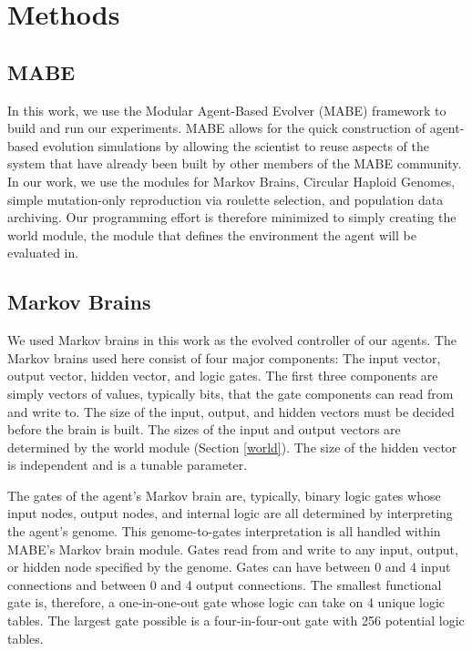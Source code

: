 \section{Methods}

\subsection{MABE}\label{mabe}

In this work, we use the Modular Agent-Based Evolver\cite{bohm_mabe_2017} (MABE) framework to build and run our experiments. MABE allows for the quick construction of agent-based evolution simulations by allowing the scientist to reuse aspects of the system that have already been built by other members of the MABE community. In our work, we use the modules for Markov Brains, Circular Haploid Genomes, simple mutation-only reproduction via roulette selection, and population data archiving. Our programming effort is therefore minimized to simply creating the world module, the module that defines the environment the agent will be evaluated in.

\subsection*{Markov Brains}

We used Markov brains in this work as the evolved controller of our agents. The Markov brains used here consist of four major components: The input vector, output vector, hidden vector, and logic gates. The first three components are simply vectors of values, typically bits, that the gate components can read from and write to. The size of the input, output, and hidden vectors must be decided before the brain is built. The sizes of the input and output vectors are determined by the world module (Section \ref{world}). The size of the hidden vector is independent and is a tunable parameter. 

The gates of the agent's Markov brain are, typically, binary logic gates whose input nodes, output nodes, and internal logic are all determined by interpreting the agent's genome. This genome-to-gates interpretation is all handled within MABE's Markov brain module. Gates read from and write to any input, output, or hidden node specified by the genome. Gates can have between 0 and 4 input connections and between 0 and 4 output connections. The smallest functional gate is, therefore, a one-in-one-out gate whose logic can take on 4 unique logic tables. The largest gate possible is a four-in-four-out gate with 256 potential logic tables.

